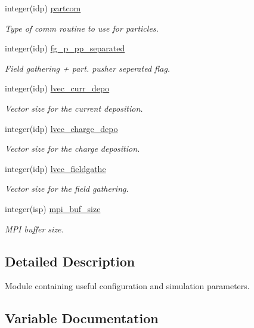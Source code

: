 \begin{DoxyCompactItemize}
integer(idp) \hyperlink{namespaceparams_aa63204e737d29465924b4275b46ddfb3}{partcom}
\begin{DoxyCompactList}\small\item\em Type of comm routine to use for particles. \end{DoxyCompactList}\item 
integer(idp) \hyperlink{namespaceparams_a041d5cfcf8653c0bd7eacd2e48077d42}{fg\+\_\+p\+\_\+pp\+\_\+separated}
\begin{DoxyCompactList}\small\item\em Field gathering + part. pusher seperated flag. \end{DoxyCompactList}\item 
integer(idp) \hyperlink{namespaceparams_aedb04c2dd01619937eaad2ce0a2626a5}{lvec\+\_\+curr\+\_\+depo}
\begin{DoxyCompactList}\small\item\em Vector size for the current deposition. \end{DoxyCompactList}\item 
integer(idp) \hyperlink{namespaceparams_a73dceeb78f9f0abe2d39ba48e2aee2d9}{lvec\+\_\+charge\+\_\+depo}
\begin{DoxyCompactList}\small\item\em Vector size for the charge deposition. \end{DoxyCompactList}\item 
integer(idp) \hyperlink{namespaceparams_acb2db26088c715aabd2ca6722e0bcdc6}{lvec\+\_\+fieldgathe}
\begin{DoxyCompactList}\small\item\em Vector size for the field gathering. \end{DoxyCompactList}\item 
integer(isp) \hyperlink{namespaceparams_aa785f776093a166811d21fa25c320b75}{mpi\+\_\+buf\+\_\+size}
\begin{DoxyCompactList}\small\item\em M\+PI buffer size. \end{DoxyCompactList}\end{DoxyCompactItemize}


\subsection{Detailed Description}
Module containing useful configuration and simulation parameters. 

\subsection{Variable Documentation}
